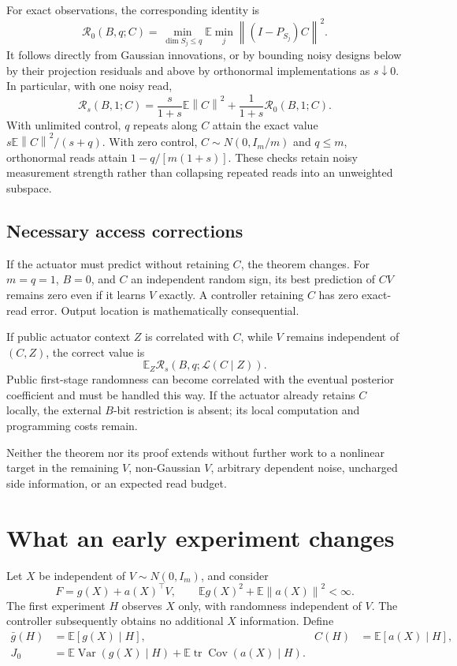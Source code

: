 \documentclass[11pt]{article}
\newcommand{\E}{\mathbb E}
\newcommand{\Var}{\operatorname{Var}}
\newcommand{\Cov}{\operatorname{Cov}}
\newcommand{\tr}{\operatorname{tr}}
\newcommand{\norm}[1]{\left\lVert#1\right\rVert}
\begin{document}
For exact observations, the corresponding identity is
\begin{equation}
\mathcal R_0(B,q;C)=
\min_{\dim S_j\le q}\E\min_j\norm{(I-P_{S_j})C}^2.
\label{eq:subspace}
\end{equation}
It follows directly from Gaussian innovations, or by bounding noisy designs below by their projection residuals and above by orthonormal implementations as $s\downarrow0$. In particular, with one noisy read,
\[
\mathcal R_s(B,1;C)=\frac{s}{1+s}\E\norm{C}^2+
\frac{1}{1+s}\mathcal R_0(B,1;C).
\]
With unlimited control, $q$ repeats along $C$ attain the exact value $s\E\norm{C}^2/(s+q)$. With zero control, $C\sim N(0,I_m/m)$ and $q\le m$, orthonormal reads attain $1-q/[m(1+s)]$. These checks retain noisy measurement strength rather than collapsing repeated reads into an unweighted subspace.

\subsection{Necessary access corrections}

If the actuator must predict without retaining $C$, the theorem changes. For $m=q=1$, $B=0$, and $C$ an independent random sign, its best prediction of $CV$ remains zero even if it learns $V$ exactly. A controller retaining $C$ has zero exact-read error. Output location is mathematically consequential.

If public actuator context $Z$ is correlated with $C$, while $V$ remains independent of $(C,Z)$, the correct value is
\[
\E_Z\mathcal R_s(B,q;\mathcal L(C\mid Z)).
\]
Public first-stage randomness can become correlated with the eventual posterior coefficient and must be handled this way. If the actuator already retains $C$ locally, the external $B$-bit restriction is absent; its local computation and programming costs remain.

Neither the theorem nor its proof extends without further work to a nonlinear target in the remaining $V$, non-Gaussian $V$, arbitrary dependent noise, uncharged side information, or an expected read budget.

\section{What an early experiment changes}

Let $X$ be independent of $V\sim N(0,I_m)$, and consider
\[
F=g(X)+a(X)^\top V,
\qquad \E g(X)^2+\E\norm{a(X)}^2<\infty.
\]
The first experiment $H$ observes $X$ only, with randomness independent of $V$. The controller subsequently obtains no additional $X$ information. Define
\begin{align*}
\bar g(H)&=\E[g(X)\mid H],& C(H)&=\E[a(X)\mid H],\\
J_0&=\E\Var(g(X)\mid H)+\E\tr\Cov(a(X)\mid H).
\end{align*}
\end{document}
